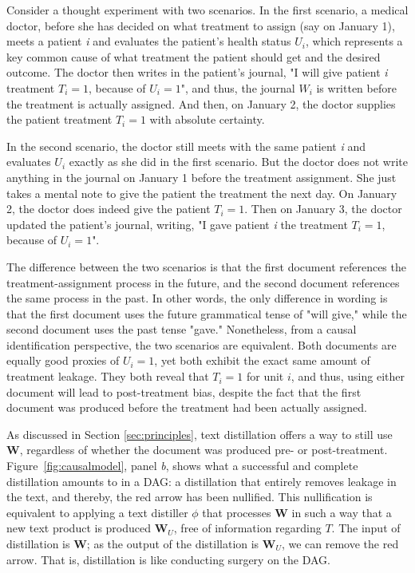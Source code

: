 \documentclass[11pt]{article}
\newcommand{\bW}{\bm{W}}  %
\begin{document}
Consider a thought experiment with two scenarios. In the first scenario, a medical doctor, before she has decided on what treatment to assign (say on January 1), meets a patient \textit{i} and evaluates the patient's health status $U_i$, which represents a key common cause of what treatment the patient should get and the desired outcome. The doctor then writes in the patient's journal, "I will give patient \textit{i}  treatment $T_i=1$, because of $U_i=1$", and thus, the journal $W_i$ is written before the treatment is actually assigned. And then, on January 2, the doctor supplies the patient treatment $T_i=1$ with absolute certainty.

In the second scenario, the doctor still meets with the same patient \textit{i} and evaluates $U_i$ exactly as she did in the first scenario. But the doctor does not write anything in the journal on January 1 before the treatment assignment. She just takes a mental note to give the patient the treatment the next day. On January 2, the doctor does indeed give the patient $T_i=1$. Then on January 3, the doctor updated the patient's journal, writing, "I gave patient \textit{i} the treatment $T_i=1$, because of $U_i=1$".

The difference between the two scenarios is that the first document references the treatment-assignment process in the future, and the second document references the same process in the past. In other words, the only difference in wording is that the first document uses the future grammatical tense of "will give," while the second document uses the past tense "gave." Nonetheless, from a causal identification perspective, the two scenarios are equivalent. Both documents are equally good proxies of $U_i=1$, yet both exhibit the exact same amount of treatment leakage. They both reveal that $T_i=1$ for unit $i$, and thus, using either document will lead to post-treatment bias, despite the fact that the first document was produced before the treatment had been actually assigned.

As discussed in Section \ref{sec:principles}, text distillation offers a way to still use $\bW$, regardless of whether the document was produced pre- or post-treatment. Figure~\ref{fig:causalmodel}, panel \textit{b}, shows what a successful and complete distillation amounts to in a DAG: a distillation that entirely removes leakage in the text, and thereby, the red arrow has been nullified. This nullification is equivalent to applying a text distiller $\phi$ that processes $\bW$ in such a way that a new text product is produced $\bW_U$, free of information regarding $T$. The input of distillation is $\bW$; as the output of the distillation is $\bW_U$, we can remove the red arrow. That is, distillation is like conducting surgery on the DAG.
\end{document}
